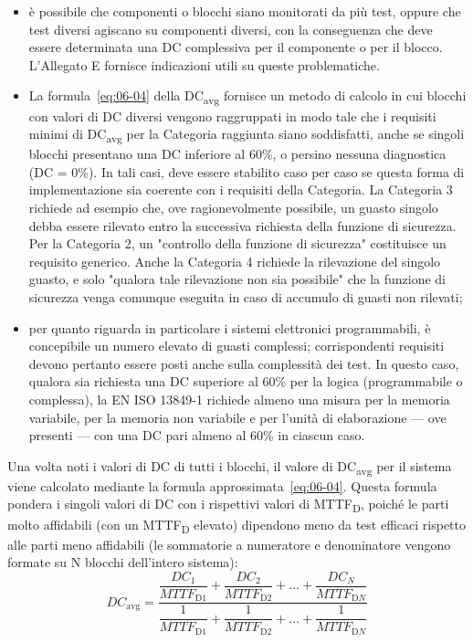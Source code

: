 \begin{itemize}
    \item è possibile che componenti o blocchi siano monitorati da più test, oppure che test diversi agiscano su componenti diversi, con la conseguenza che deve essere determinata una DC complessiva per il componente o per il blocco. L'Allegato E fornisce indicazioni utili su queste problematiche.
    \item La formula~\eqref{eq:06-04} della DC\textsubscript{avg} fornisce un metodo di calcolo in cui blocchi con valori di DC diversi vengono raggruppati in modo tale che i requisiti minimi di DC\textsubscript{avg} per la Categoria raggiunta siano soddisfatti, anche se singoli blocchi presentano una DC inferiore al 60\%, o persino nessuna diagnostica (DC = 0\%). In tali casi, deve essere stabilito caso per caso se questa forma di implementazione sia coerente con i requisiti della Categoria. La Categoria 3 richiede ad esempio che, ove ragionevolmente possibile, un guasto singolo debba essere rilevato entro la successiva richiesta della funzione di sicurezza. Per la Categoria 2, un "controllo della funzione di sicurezza" costituisce un requisito generico. Anche la Categoria 4 richiede la rilevazione del singolo guasto, e solo "qualora tale rilevazione non sia possibile" che la funzione di sicurezza venga comunque eseguita in caso di accumulo di guasti non rilevati;
    \item per quanto riguarda in particolare i sistemi elettronici programmabili, è concepibile un numero elevato di guasti complessi; corrispondenti requisiti devono pertanto essere posti anche sulla complessità dei test. In questo caso, qualora sia richiesta una DC superiore al 60\% per la logica (programmabile o complessa), la EN ISO 13849-1 richiede almeno una misura per la memoria variabile, per la memoria non variabile e per l'unità di elaborazione — ove presenti — con una DC pari almeno al 60\% in ciascun caso.
\end{itemize}

Una volta noti i valori di DC di tutti i blocchi, il valore di DC\textsubscript{avg} per il sistema viene calcolato mediante la formula approssimata~\eqref{eq:06-04}. Questa formula pondera i singoli valori di DC con i rispettivi valori di MTTF\textsubscript{D}, poiché le parti molto affidabili (con un MTTF\textsubscript{D} elevato) dipendono meno da test efficaci rispetto alle parti meno affidabili (le sommatorie a numeratore e denominatore vengono formate su N blocchi dell'intero sistema):
\begin{equation}
    \textit{DC}_{\mathrm{avg}} =
    \frac{\dfrac{\textit{DC}_1}{\textit{MTTF}_{\mathrm{D1}}} + \dfrac{\textit{DC}_2}{\textit{MTTF}_{\mathrm{D2}}} + \ldots + \dfrac{\textit{DC}_N}{\textit{MTTF}_{\mathrm{D}N}}}
         {\dfrac{1}{\textit{MTTF}_{\mathrm{D1}}} + \dfrac{1}{\textit{MTTF}_{\mathrm{D2}}} + \ldots + \dfrac{1}{\textit{MTTF}_{\mathrm{D}N}}}
    \label{eq:06-04}
\end{equation}

